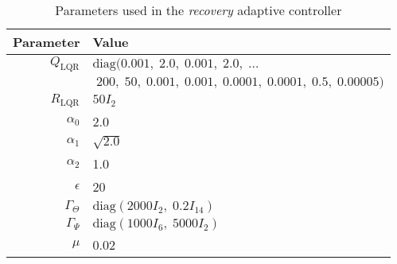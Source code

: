 
\begin{table}[htb]
 \renewcommand{\arraystretch}{1.6}
  \begin{tabular}{r|l}
    \textbf{Parameter} & \textbf{Value} \\
    \hline
	$Q_{\textrm{LQR}}$ & $\text{diag}(0.001, \; 2.0, \; 0.001, \; 2.0, \; \ldots $\\ & \qquad $\; 200, \; 50, \; 0.001, \; 0.001, \; 0.0001, \; 0.0001, \; 0.5, \; 0.00005)$ \\ 
	$R_{\textrm{LQR}}$ & $50 I_2$ \\
	$\alpha_0$ & 2.0 \\
	$\alpha_1$ & $\sqrt{2.0}$ \\
	$\alpha_2$ & 1.0 \\
	$\epsilon$ & 20 \\
	$\Gamma_\Theta$ & $\text{diag}(2000 I_2, \;0.2 I_{14})$ \\
	$\Gamma_\Psi$ & $\text{diag}(1000 I_6, \; 5000 I_2)$ \\
	$\mu$ & 0.02
  \end{tabular}
  \caption{Parameters used in the \textit{recovery} adaptive controller}
\end{table}

\clearpage
\newpage
